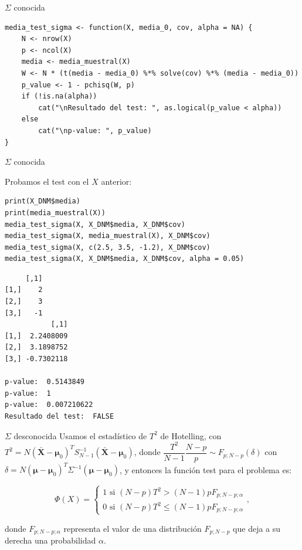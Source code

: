 \documentclass[xcolor=table]{beamer}
\begin{document}
\begin{frame}[fragile]{$\Sigma$ conocida}
\begin{lstlisting}
media_test_sigma <- function(X, media_0, cov, alpha = NA) {
    N <- nrow(X)
    p <- ncol(X)
    media <- media_muestral(X)
    W <- N * (t(media - media_0) %*% solve(cov) %*% (media - media_0))
    p_value <- 1 - pchisq(W, p)
    if (!is.na(alpha))
        cat("\nResultado del test: ", as.logical(p_value < alpha))
    else
        cat("\np-value: ", p_value)
}
\end{lstlisting}
\end{frame}

\begin{frame}[fragile]{$\Sigma$ conocida}

Probamos el test con el $X$ anterior:

\scriptsize
\begin{lstlisting}
print(X_DNM$media)
print(media_muestral(X))
media_test_sigma(X, X_DNM$media, X_DNM$cov)
media_test_sigma(X, media_muestral(X), X_DNM$cov)
media_test_sigma(X, c(2.5, 3.5, -1.2), X_DNM$cov)
media_test_sigma(X, X_DNM$media, X_DNM$cov, alpha = 0.05)
\end{lstlisting}

\scriptsize
\begin{lstlisting}
     [,1]
[1,]    2
[2,]    3
[3,]   -1
           [,1]
[1,]  2.2408009
[2,]  3.1898752
[3,] -0.7302118

p-value:  0.5143849
p-value:  1
p-value:  0.007210622
Resultado del test:  FALSE
\end{lstlisting}


\end{frame}


\begin{frame}[fragile]{$\Sigma$ desconocida}
Usamos el estadístico de $T^2$ de Hotelling, con $T^2 = N (\pmb{\bar{X}} - \pmb{\mu}_0)^T S_{N-1}^{-1} (\pmb{\bar{X}} - \pmb{\mu}_0)$, donde $\dfrac{T^2}{N-1} \dfrac{N-p}{p} \sim F_{p;N-p}(\delta)$ con $\delta = N (\pmb{\mu} - \pmb{\mu}_0)^T \Sigma^{-1} (\pmb{\mu} - \pmb{\mu}_0)$, y entonces la función test para el problema es:

$$ \Phi(X) = \begin{cases} 1 \text{ si } (N-p)T^2 > (N-1)pF_{p;N-p;\alpha} \\ 0 \text{ si } (N-p)T^2 \leq (N-1)pF_{p;N-p;\alpha} \end{cases}, $$

donde $F_{p;N-p;\alpha}$ representa el valor de una distribución $F_{p;N-p}$ que deja a su derecha una probabilidad $\alpha$.
\end{frame}
\end{document}

